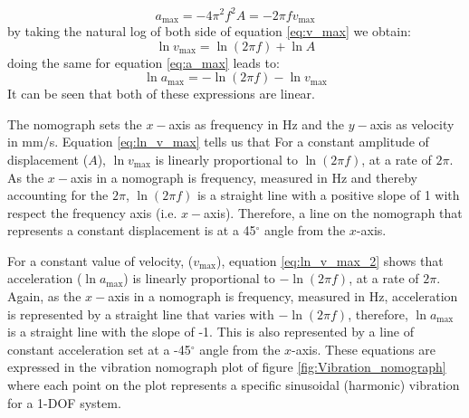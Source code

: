 \documentclass[12pt,letter]{article}
\numberwithin{ex}{section} %
\numberwithin{re}{section} %
\numberwithin{vcs}{section} %
\begin{document}
\begin{equation}
    a_\text{max} = -4\pi^2 f^2 A = -2 \pi f v_\text{max}
    \label{eq:a_max}
\end{equation}
by taking the natural log of both side of equation \ref{eq:v_max} we obtain: 
\begin{equation}
    \ln v_\text{max} = \ln(2\pi f) + \ln A
    \label{eq:ln_v_max} 
\end{equation}
doing the same for equation \ref{eq:a_max} leads to:
\begin{equation}
     \ln a_\text{max} = - \ln(2\pi f) - \ln v_\text{max}
    \label{eq:ln_v_max_2} 
\end{equation}
It can be seen that both of these expressions are linear. 



The nomograph sets the $x-$axis as frequency in Hz and the $y-$axis as velocity in mm/s. Equation \ref{eq:ln_v_max} tells us that For a constant amplitude of displacement ($A$), $\ln v_\text{max}$ is linearly proportional to $\ln (2 \pi f)$, at a rate of $2 \pi$. As the $x-$axis in a nomograph is frequency, measured in Hz and thereby accounting for the $2 \pi$, $\ln (2 \pi f)$ is a straight line with a positive slope of 1 with respect the frequency axis (i.e. $x-$axis). Therefore, a line on the nomograph that represents a constant displacement is at a 45$^\circ$ angle from the $x$-axis. 


For a constant value of velocity, ($v_\text{max}$), equation \ref{eq:ln_v_max_2} shows that acceleration ($\ln a_\text{max}$) is linearly proportional to $-\ln (2 \pi f)$, at a rate of $2 \pi$. Again, as the $x-$axis in a nomograph is frequency, measured in Hz, acceleration is represented by a straight line that varies with $- \ln(2\pi f)$, therefore, $\ln a_\text{max}$ is a straight line with the slope of -1. This is also represented by a line of constant acceleration set at a -45$^\circ$ angle from the $x$-axis. These equations are expressed in the vibration nomograph plot of figure \ref{fig:Vibration_nomograph} where each point on the plot represents a specific sinusoidal (harmonic) vibration for a 1-DOF system.  
\end{document}
